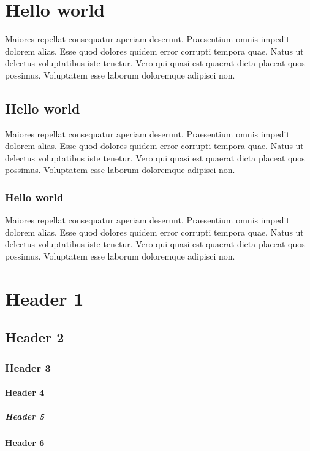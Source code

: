 \documentclass[a4paper]{article}
\begin{document}
\section{Hello world} \label{hello-world-2}
Maiores repellat consequatur aperiam deserunt.  
Praesentium omnis impedit dolorem alias.   
Esse quod dolores quidem error corrupti tempora quae.  
Natus ut delectus voluptatibus iste tenetur.  
Vero qui quasi est quaerat dicta placeat quos possimus.  
Voluptatem esse laborum doloremque adipisci non.

\subsection{Hello world} \label{hello-world-1}
Maiores repellat consequatur aperiam deserunt.  
Praesentium omnis impedit dolorem alias.   
Esse quod dolores quidem error corrupti tempora quae.  
Natus ut delectus voluptatibus iste tenetur.  
Vero qui quasi est quaerat dicta placeat quos possimus.  
Voluptatem esse laborum doloremque adipisci non.

\subsubsection{Hello world} \label{hello-world}
Maiores repellat consequatur aperiam deserunt.  
Praesentium omnis impedit dolorem alias.   
Esse quod dolores quidem error corrupti tempora quae.  
Natus ut delectus voluptatibus iste tenetur.  
Vero qui quasi est quaerat dicta placeat quos possimus.  
Voluptatem esse laborum doloremque adipisci non.

\section{Header 1} \label{header-1}

\subsection{Header 2} \label{header-2}

\subsubsection{Header 3} \label{header-3}

\paragraph{Header 4} \label{header-4}

\subparagraph{Header 5} \label{header-5}

\textbf{Header 6} \label{header-6}
\end{document}
